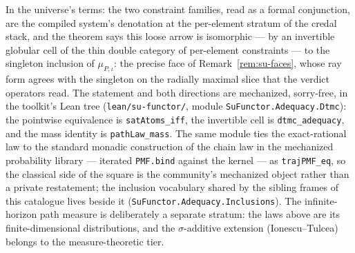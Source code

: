 In the universe's terms: the two constraint families, read as a
formal conjunction, are the compiled system's denotation at the
per-element stratum of the credal stack, and the theorem says this
loose arrow is isomorphic --- by an invertible globular cell of the
thin double category of per-element constraints --- to the singleton
inclusion of $\mu_{P,\iota}$: the precise face of
Remark~\ref{rem:su-faces}, whose ray form agrees with the singleton
on the radially maximal slice that the verdict operators read. The
statement and both directions are mechanized, sorry-free, in the
toolkit's Lean tree (\texttt{lean/su-functor/}, module
\texttt{SuFunctor.Adequacy.Dtmc}): the pointwise equivalence is
\texttt{satAtoms\_iff}, the invertible cell is
\texttt{dtmc\_adequacy}, and the mass identity is
\texttt{pathLaw\_mass}. The same module ties the exact-rational law
to the standard monadic construction of the chain law in the
mechanized probability library --- iterated \texttt{PMF.bind}
against the kernel --- as \texttt{trajPMF\_eq}, so the classical
side of the square is the community's mechanized object rather than
a private restatement; the inclusion vocabulary shared by the
sibling frames of this catalogue lives beside it
(\texttt{SuFunctor.Adequacy.Inclusions}). The infinite-horizon path
measure is deliberately a separate stratum: the laws above are its
finite-dimensional distributions, and the $\sigma$-additive
extension (Ionescu--Tulcea) belongs to the measure-theoretic tier.

